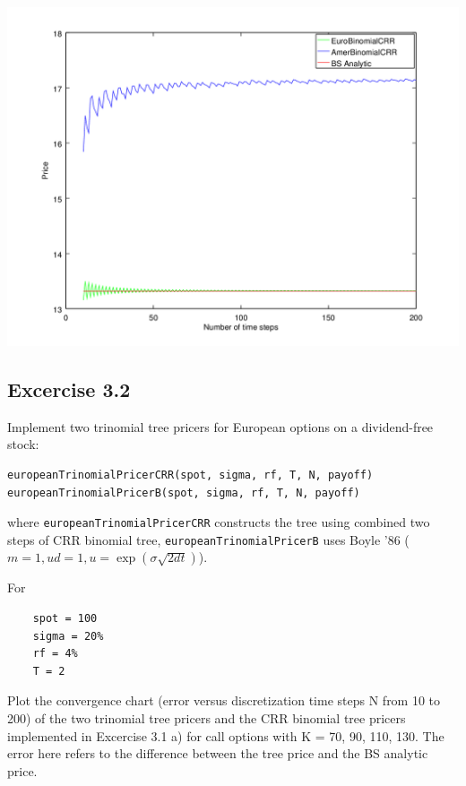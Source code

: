 \documentclass[12pt,a4paper,hidelinks,fleqn]{article}            %
\begin{document}
\begin{center}
\includegraphics[scale=0.7]{binomialtreePrices}
\end{center}


\subsection*{Excercise 3.2}
Implement two trinomial tree pricers for European options on a dividend-free stock:  
\vspace{-5mm}
\begin{verbatim}
europeanTrinomialPricerCRR(spot, sigma, rf, T, N, payoff)
europeanTrinomialPricerB(spot, sigma, rf, T, N, payoff)
\end{verbatim}
\vspace{-5mm}
where \verb=europeanTrinomialPricerCRR= constructs the tree using combined two steps of CRR binomial tree,
\verb=europeanTrinomialPricerB= uses Boyle '86 ($m=1, ud=1, u = \exp(\sigma\sqrt{2dt})$).

For 
\vspace{-1cm} 
\begin{verbatim}
    spot = 100
    sigma = 20%
    rf = 4%
    T = 2
\end{verbatim} 

Plot the convergence chart (error versus discretization time steps N from 10 to 200) of the two trinomial tree pricers and the CRR binomial tree pricers implemented in Excercise 3.1 a) for call options with K = 70, 90, 110, 130.
The error here refers to the difference between the tree price and the BS analytic price.
\end{document}

